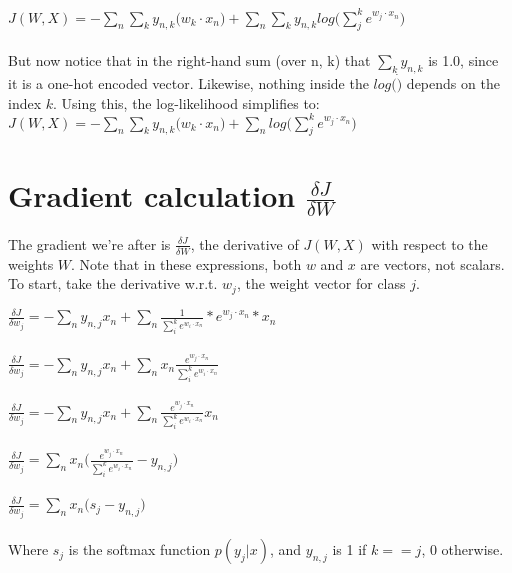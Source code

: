 \documentclass{article}
\begin{document}
$ \boxed{ J(W,X) = - \sum_{n} \sum_{k} y_{n,k}\big(w_{k} \cdot x_{n}\big) + \sum_{n} \sum_{k} y_{n,k} log\big(\sum_{j}^{k} e^{w_{j} \cdot x_{n}}\big) }$ \\ \\

But now notice that in the right-hand sum (over n, k) that $\sum_{k} y_{n,k}$ is 1.0, since it is a one-hot encoded vector. Likewise, nothing inside the $log(\dot)$ depends on the index $k$. Using this, the log-likelihood simplifies to: \\

$ \boxed{ J(W,X) = - \sum_{n} \sum_{k} y_{n,k}\big(w_{k} \cdot x_{n}\big) + \sum_{n} log\big(\sum_{j}^{k} e^{w_{j} \cdot x_{n}}\big) }$ \\


\section{Gradient calculation $\frac{\delta J}{\delta W}$}

The gradient we're after is $\frac{\delta J}{\delta W}$, the derivative of $J(W,X)$ with respect to the weights $W$.
Note that in these expressions, both $w$ and $x$ are vectors, not scalars. To start, take the derivative w.r.t. $w_j$, the weight vector for class $j$.

$\frac{\delta J}{\delta w_{j}} = - \sum_{n} y_{n,j} x_{n} + \sum_{n} \frac{1}{\sum_{i}^{k} e^{w_{i} \cdot x_{n}}} * e^{w_j \cdot x_{n}} * x_{n}  $ \\ \\

$\frac{\delta J}{\delta w_{j}} = - \sum_{n} y_{n,j} x_{n} + \sum_{n} x_{n} \frac{e^{w_j \cdot x_{n}}} {\sum_{i}^{k} e^{w_{i} \cdot x_{n}}}  $ \\ \\

$\frac{\delta J}{\delta w_{j}} = - \sum_{n} y_{n,j} x_{n} + \sum_{n} \frac{e^{w_j \cdot x_{n}}} {\sum_{i}^{k} e^{w_{i} \cdot x_{n}}} x_{n} $ \\ \\


$\frac{\delta J}{\delta w_{j}} = \sum_{n} x_{n} \big(\frac{e^{w_j \cdot x_{n}}} {\sum_{i}^{k} e^{w_{i} \cdot x_{n}}} - y_{n,j}\big) $ \\ \\

$\frac{\delta J}{\delta w_{j}} = \sum_{n} x_{n} \big(s_{j} - y_{n,j}\big) $ \\ \\

Where $s_{j}$ is the softmax function $p(y_{j}|x)$, and $y_{n,j}$ is 1 if $k == j$, 0 otherwise.
\end{document}
